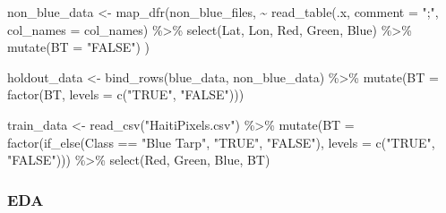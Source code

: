 \documentclass[
]{article}
\newenvironment{Shaded}{\begin{snugshade}}{\end{snugshade}}
\newcommand{\AttributeTok}[1]{\textcolor[rgb]{0.77,0.63,0.00}{#1}}
\newcommand{\FunctionTok}[1]{\textcolor[rgb]{0.00,0.00,0.00}{#1}}
\newcommand{\NormalTok}[1]{#1}
\newcommand{\OtherTok}[1]{\textcolor[rgb]{0.56,0.35,0.01}{#1}}
\newcommand{\SpecialCharTok}[1]{\textcolor[rgb]{0.00,0.00,0.00}{#1}}
\newcommand{\StringTok}[1]{\textcolor[rgb]{0.31,0.60,0.02}{#1}}
\begin{document}
\begin{Shaded}
\begin{Highlighting}[]
\NormalTok{non\_blue\_data }\OtherTok{\textless{}{-}} \FunctionTok{map\_dfr}\NormalTok{(non\_blue\_files, }\SpecialCharTok{\textasciitilde{}} 
  \FunctionTok{read\_table}\NormalTok{(.x, }\AttributeTok{comment =} \StringTok{";"}\NormalTok{, }\AttributeTok{col\_names =}\NormalTok{ col\_names) }\SpecialCharTok{\%\textgreater{}\%} 
    \FunctionTok{select}\NormalTok{(Lat, Lon, Red, Green, Blue) }\SpecialCharTok{\%\textgreater{}\%} 
    \FunctionTok{mutate}\NormalTok{(}\AttributeTok{BT =} \StringTok{"FALSE"}\NormalTok{)}
\NormalTok{)}

\NormalTok{holdout\_data }\OtherTok{\textless{}{-}} \FunctionTok{bind\_rows}\NormalTok{(blue\_data, non\_blue\_data) }\SpecialCharTok{\%\textgreater{}\%} 
  \FunctionTok{mutate}\NormalTok{(}\AttributeTok{BT =} \FunctionTok{factor}\NormalTok{(BT, }\AttributeTok{levels =} \FunctionTok{c}\NormalTok{(}\StringTok{"TRUE"}\NormalTok{, }\StringTok{"FALSE"}\NormalTok{)))}
\end{Highlighting}
\end{Shaded}

\begin{Shaded}
\begin{Highlighting}[]
\NormalTok{train\_data }\OtherTok{\textless{}{-}} \FunctionTok{read\_csv}\NormalTok{(}\StringTok{"HaitiPixels.csv"}\NormalTok{) }\SpecialCharTok{\%\textgreater{}\%}
  \FunctionTok{mutate}\NormalTok{(}\AttributeTok{BT =} \FunctionTok{factor}\NormalTok{(}\FunctionTok{if\_else}\NormalTok{(Class }\SpecialCharTok{==} \StringTok{"Blue Tarp"}\NormalTok{, }\StringTok{"TRUE"}\NormalTok{, }\StringTok{"FALSE"}\NormalTok{), }\AttributeTok{levels =} \FunctionTok{c}\NormalTok{(}\StringTok{"TRUE"}\NormalTok{, }\StringTok{"FALSE"}\NormalTok{))) }\SpecialCharTok{\%\textgreater{}\%}
  \FunctionTok{select}\NormalTok{(Red, Green, Blue, BT)}
\end{Highlighting}
\end{Shaded}

\hypertarget{eda}{%
\subsubsection{EDA}\label{eda}}
\end{document}
